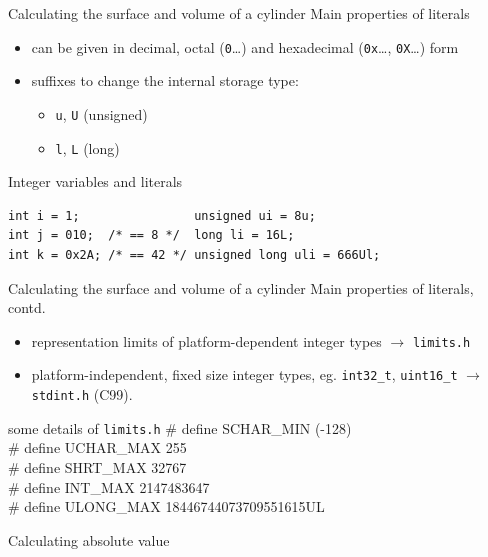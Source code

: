\documentclass[usenames,dvipsnames,aspectratio=169]{beamer}
\begin{document}
\begin{frame}[fragile]{Calculating the surface and volume of a cylinder}
  Main properties of  literals
  \begin{itemize}
    \item can be given in decimal, octal (\texttt{0}\dots) and hexadecimal (\texttt{0x}\dots, \texttt{0X}\dots) form
    \item suffixes to change the internal storage type:
    \begin{itemize}
      \item \texttt{u}, \texttt{U} (unsigned)
      \item \texttt{l}, \texttt{L} (long)
    \end{itemize}
  \end{itemize}
  \begin{exampleblock}{Integer variables and literals}
    \begin{verbatim}
int i = 1;                unsigned ui = 8u;
int j = 010;  /* == 8 */  long li = 16L;
int k = 0x2A; /* == 42 */ unsigned long uli = 666Ul;
\end{verbatim}
  \end{exampleblock}
\end{frame}

\begin{frame}{Calculating the surface and volume of a cylinder}
  Main properties of  literals, contd.
  \begin{itemize}
    \item representation limits of platform-dependent integer types $\to$ \texttt{limits.h}
    \item platform-independent, fixed size integer types, eg. \texttt{int32\_t}, \texttt{uint16\_t} $\rightarrow$ \texttt{stdint.h} (C99).
  \end{itemize}
  \begin{block}{some details of \texttt{limits.h}}
\#  define SCHAR\_MIN     (-128)\\
\#  define UCHAR\_MAX     255\\
\#  define SHRT\_MAX      32767\\
\#  define INT\_MAX       2147483647\\
\#  define ULONG\_MAX     18446744073709551615UL
  \end{block}
\end{frame}

\begin{frame}{Calculating absolute value}
  \begin{columns}[T]
      \begin{exampleblock}{}
        \scriptsize
        
      \end{exampleblock}
      \begin{exampleblock}{}
        \scriptsize
        
      \end{exampleblock}
  \end{columns}
\end{frame}
\end{document}
